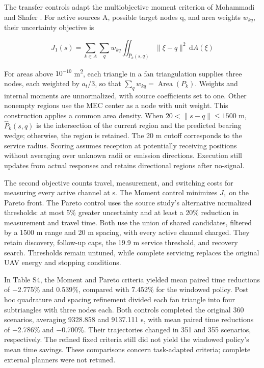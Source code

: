 \documentclass[11pt,letterpaper]{article}
\begin{document}
The transfer controls adapt the multiobjective moment criterion of Mohammadi and Shafer \cite{sref5}. For active sources A, possible target nodes q, and area weights $w_{kq}$, their uncertainty objective is

\begin{equation}\label{eq:s2}
J_1(s)=\sum_{k\in A}\sum_q w_{kq}\iint_{\widehat P_k(s,q)}\lVert\xi-q\rVert^2\,\mathrm dA(\xi)
\end{equation}

For areas above $10^{-10}$ m\textsuperscript{2}, each triangle in a fan triangulation supplies three nodes, each weighted by $a_t/3$, so that $\sum_q w_{kq}=\operatorname{Area}(P_k)$. Weights and internal moments are unnormalized, with source coefficients set to one. Other nonempty regions use the MEC center as a node with unit weight. This construction applies a common area density. When $20<\lVert s-q\rVert\le1500$ m, $\widehat P_k(s,q)$ is the intersection of the current region and the predicted bearing wedge; otherwise, the region is retained. The 20 m cutoff corresponds to the service radius. Scoring assumes reception at potentially receiving positions without averaging over unknown radii or emission directions. Execution still updates from actual responses and retains directional regions after no-signal.

The second objective counts travel, measurement, and switching costs for measuring every active channel at s. The Moment control minimizes $J_1$ on the Pareto front. The Pareto control uses the source study's alternative normalized thresholds: at most 5\% greater uncertainty and at least a 20\% reduction in measurement and travel time. Both use the union of shared candidates, filtered by a 1500 m range and 20 m spacing, with every active channel charged. They retain discovery, follow-up caps, the 19.9 m service threshold, and recovery search. Thresholds remain untuned, while complete servicing replaces the original UAV energy and stopping conditions.

In Table S4, the Moment and Pareto criteria yielded mean paired time reductions of \ensuremath{-}2.775\% and 0.539\%, compared with 7.452\% for the windowed policy. Post hoc quadrature and spacing refinement divided each fan triangle into four subtriangles with three nodes each. Both controls completed the original 360 scenarios, averaging 9328.858 and 9137.111 s, with mean paired time reductions of \ensuremath{-}2.786\% and \ensuremath{-}0.700\%. Their trajectories changed in 351 and 355 scenarios, respectively. The refined fixed criteria still did not yield the windowed policy's mean time savings. These comparisons concern task-adapted criteria; complete external planners were not retuned.
\end{document}
